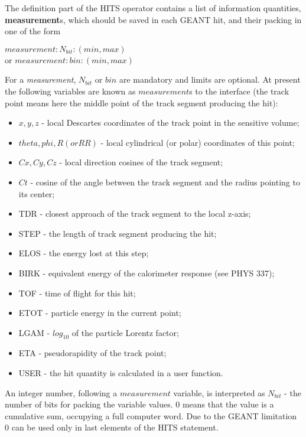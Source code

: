 The definition part of the { HITS}  operator contains a list
of information quantities, {\bf measurement}s, 
which should be saved in each GEANT hit, and their packing
in one of the form
\begin{center}
{ \hspace{0.4cm}  $measurement:N_{bit}:(min,max)$ \\
              or  $measurement:bin:(min,max)$   }
\end{center}

For a {\it measurement}, $N_{bit}$ or $bin$ are mandatory 
and limits are optional.
At present the following variables are known as $measurement$s 
to the \as interface
(the track point means here the middle point of the track 
segment producing the hit):
 
\begin{itemize}
\item  $x,y,z$ - local Descartes coordinates of the track point 
               in the sensitive volume;
\item  $theta, phi, R(or RR)$  - local cylindrical (or polar) coordinates 
               of this point;
\item  $Cx, Cy, Cz$  - local direction cosines of the track segment;
\item  $Ct$  - cosine of the angle between the track segment and the
               radius pointing to its center;
\item  TDR   - closest approach of the track segment to the local z-axis;
\item  STEP  - the length of track segment producing the hit;
\item  ELOS  - the energy lost at this step;
\item  BIRK  - equivalent energy of the calorimeter response (see PHYS 337);
\item  TOF   - time of flight for this hit;
\item  ETOT  - particle energy in the current point;
\item  LGAM  - $log_{10}$ of the particle Lorentz factor;
\item  ETA   - pseudorapidity of the track point;
\item  USER  - the hit quantity is calculated in a user function.
\end{itemize}


An integer number, following a $measurement$ variable, is interpreted as
$N_{bit}$ - the number of bits for packing the variable values.
 0 means  that the value is a  cumulative sum, occupying a full computer word.
 Due to the GEANT limitation 0 can be used only in last elements 
of the { HITS} statement.

